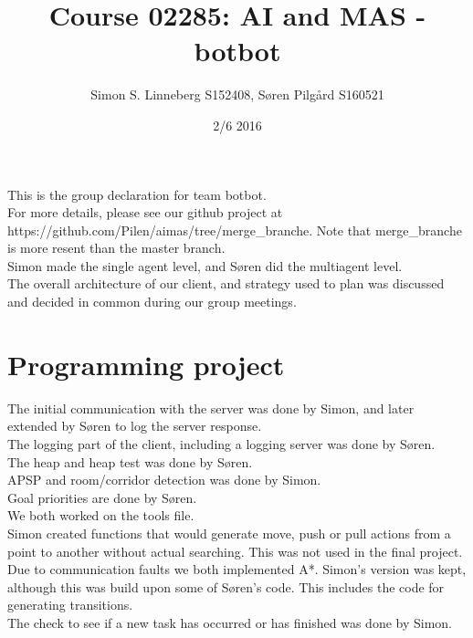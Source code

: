 \documentclass{article}
\title{Course 02285: AI and MAS - botbot}
\author{Simon S. Linneberg S152408, Søren Pilgård S160521}
\date{2/6 2016}
\begin{document}
\maketitle
This is the group declaration for team botbot.\\

For more details, please see our github project at https://github.com/Pilen/aimas/tree/merge\_branche.
Note that merge\_branche is more resent than the master branch.\\

Simon made the single agent level, and Søren did the multiagent level.\\

The overall architecture of our client, and strategy used to plan was discussed
and decided in common during our group meetings.\\

\section{Programming project}
The initial communication with the server was done by Simon, and later extended
by Søren to log the server response.\\

The logging part of the client, including a logging server was done by Søren.\\

The heap and heap test was done by Søren.\\

APSP and room/corridor detection was done by Simon.\\

Goal priorities are done by Søren.\\

We both worked on the tools file.\\

Simon created functions that would generate move, push or pull actions from a point
to another without actual searching. This was not used in the final project.\\

Due to communication faults we both implemented A*. Simon's version was kept, although
this was build upon some of Søren's code. This includes the code for generating
transitions.\\

The check to see if a new task has occurred or has finished was done by Simon.\\
\end{document}
